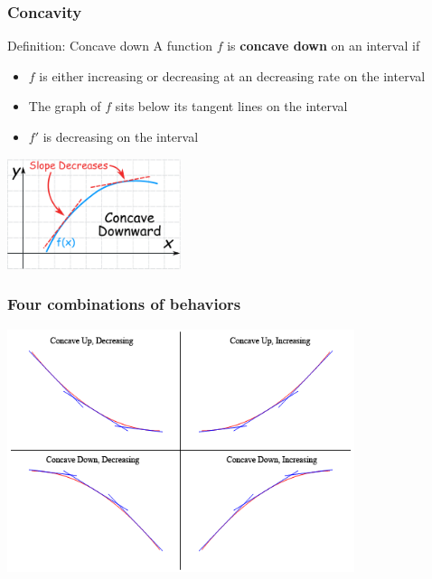 \documentclass{beamer}
\begin{document}
\begin{frame}
    \frametitle{Concavity}

    \begin{block}{Definition: Concave down}
        A function $f$ is \textbf{concave \alert{down}} on an interval if

        \begin{itemize}
            \item $f$ is either increasing or decreasing at an \alert{decreasing} rate on the interval
            \item The graph of $f$ sits \alert{below} its tangent lines on the interval
            \item $f'$ is \alert{decreasing} on the interval
        \end{itemize}
    \end{block}

\begin{center}
    \includegraphics[width=2in]{concave-downward.png}
\end{center}


\end{frame}

\begin{frame}
    \frametitle{Four combinations of behaviors}

    \begin{center}
        \includegraphics[width=4in]{behavior-combos.png}
    \end{center}

\end{frame}
\end{document}
